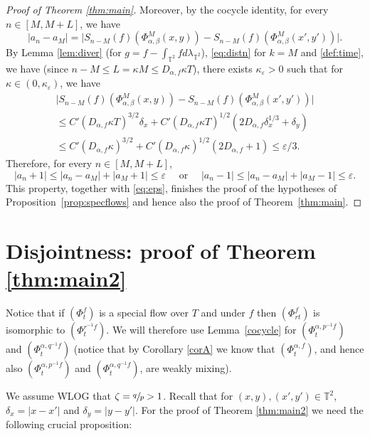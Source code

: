 \documentclass[10pt]{amsart}
\let\epsilon\varepsilon
\theoremstyle{definition}
\theoremstyle{plain}
\newcommand\TT{\mathbb{T}}
\begin{document}
\begin{proof}[Proof of Theorem \ref{thm:main}]
Moreover, by the cocycle identity, for every $n\in [M,M+L]$, we have
\[
|a_n-a_M|=\bigl|S_{n-M}(f)(\Phi_{\alpha,\beta}^M(x,y))-S_{n-M}(f)(\Phi_{\alpha,\beta}^M(x',y'))\bigr|.
\]
By Lemma \ref{lem:diver} (for $g=f-\int_{\TT^2}f d\lambda_{\TT^2}$), \eqref{eq:distn} for $k=M$ and \eqref{def:time}, we have (since $n-M\leq L=\kappa M\leq D_{\alpha,f}\kappa T$),
there exists $\kappa_\epsilon>0$ such that for $\kappa\in (0, \kappa_\epsilon)$, we have
\begin{multline*}
\bigl|S_{n-M}(f)(\Phi_{\alpha,\beta}^M(x,y))-S_{n-M}(f)(\Phi_{\alpha,\beta}^M(x',y'))\bigl|\\
\leq C'(D_{\alpha,f}\kappa T)^{3/2}\delta_x+ C'(D_{\alpha,f}\kappa T)^{1/2}(2D_{\alpha,f}\delta_x^{1/3}+\delta_y)\\
\leq
C'(D_{\alpha,f}\kappa)^{3/2}+C'(D_{\alpha,f}\kappa)^{1/2}(2D_{\alpha,f}+1)\leq \epsilon/3.
\end{multline*}
Therefore, for every $n\in [M,M+L]$,
\[
|a_n + 1|\leq |a_n-a_M|+|a_M+ 1|\leq \epsilon \quad \text{ or } \quad |a_n - 1|\leq |a_n-a_M|+|a_M- 1| \leq \epsilon.
\]
This property, together with \eqref{eq:eps}, finishes the proof of the hypotheses of Proposition~\ref{prop:specflows} and hence also the proof of Theorem~\ref{thm:main}.
\end{proof}

\section{Disjointness: proof of Theorem \ref{thm:main2}}\label{sec:proof2}
Notice that if $(\Phi_t^f)$ is a special flow over $T$ and under $f$ then $(\Phi_{rt}^f)$ is isomorphic to $(\Phi_t^{r^{-1}f})$. We will therefore use Lemma~\ref{cocycle} for
$(\Phi_t^{\alpha,p^{-1}f})$ and $(\Phi_t^{\alpha,q^{-1}f})$ (notice that by Corollary \ref{corA} we know that $(\Phi_t^{\alpha,f})$, and hence also $(\Phi_t^{\alpha,p^{-1}f})$ and $(\Phi_t^{\alpha,q^{-1}f})$, are weakly mixing).

We assume WLOG that $\zeta=\sfrac{q}{p}>1$. Recall that for $(x,y),(x',y')\in \TT^2$, \hbox{$\delta_x=\vert x-x'\vert$} and $\delta_y=\vert y-y'\vert$. For the proof of Theorem \ref{thm:main2} we need the following crucial proposition:
\end{document}
